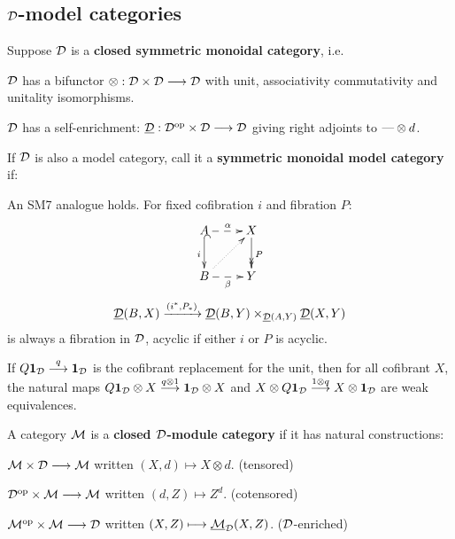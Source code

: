 \documentclass[11pt]{article}
\begin{document}
\begin{MichaelStableModelCats}
\subsection{$\mathcal{D}$-model categories}
\begin{itemise}
\item Suppose $\mathcal{D}$ is a \textbf{closed symmetric monoidal category}, i.e.
\begin{itemise}
\item $\mathcal{D}$ has a bifunctor $\otimes:\mathcal{D}\times\mathcal{D}\longrightarrow\mathcal{D}$ with unit, associativity commutativity and unitality isomorphisms.
\item $\mathcal{D}$ has a self-enrichment: $\underline{\mathcal{D}}:\mathcal{D}^{\textup{op}}\times\mathcal{D}\longrightarrow\mathcal{D}$ giving right adjoints to $\textup{---}\otimes d$.
\end{itemise}
\item If $\mathcal{D}$ is also a model category, call it a \textbf{symmetric monoidal model category} if:
\begin{itemise}
\item An SM7 analogue holds. For fixed cofibration $i$ and fibration $P$:
\[\xymatrix{
A\ar@{-->}[r]^\alpha\ar@{^{(}->}[d]_i&X\ar@{->>}[d]^P\\
B\ar@{-->}[r]_\beta\ar@{..>}[ur]&Y
}\]
 \[\underline{\mathcal{D}}(B,X)\xrightarrow{(i^*,P_*)}\underline{\mathcal{D}}(B,Y)\times_{\underline{\mathcal{D}}(A,Y)}\underline{\mathcal{D}}(X,Y)\]
is always a fibration in $\mathcal{D}$, acyclic if either $i$ or $P$ is acyclic. %
\item If $Q\textbf{1}_{\mathcal{D}}\overset{q}{\longrightarrow}\textbf{1}_{\mathcal{D}}$ is the cofibrant replacement for the unit, then for all cofibrant $X$, the natural maps $Q\textbf{1}_{\mathcal{D}}\otimes X\overset{q\otimes1}{\longrightarrow}\textbf{1}_{\mathcal{D}}\otimes X$ and $X\otimes Q\textbf{1}_{\mathcal{D}} \overset{1\otimes q}{\longrightarrow}X\otimes \textbf{1}_{\mathcal{D}}$ are weak equivalences.
\end{itemise}
\item A category $\mathcal{M}$ is a \textbf{closed $\mathcal{D}$-module category} if it has natural constructions:
\begin{itemise}
\item $\mathcal{M}\times \mathcal{D}\longrightarrow\mathcal{M}$ written $(X,d)\mapsto X\otimes d$. {(tensored)}
\item $\mathcal{D}^{\textup{op}}\times\mathcal{M}\longrightarrow\mathcal{M}$ written $(d,Z)\mapsto Z^d$. {(cotensored)}
\item $\mathcal{M}^{\textup{op}}\times\mathcal{M}\longrightarrow\mathcal{D}$ written $(X,Z)\longmapsto \underline{\mathcal{M}}_{\mathcal{D}}(X,Z)$. {($\mathcal{D}$-enriched)}
\end{itemise}

\end{itemise}
\end{MichaelStableModelCats}
\end{document}
